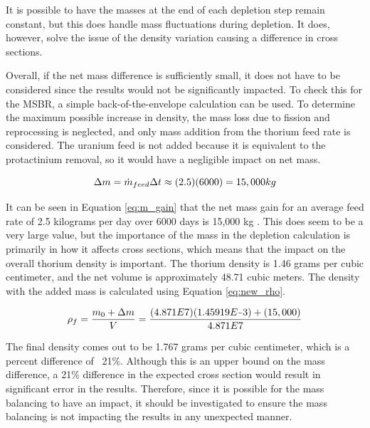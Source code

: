 It is possible to have the masses at the end of each depletion step remain constant, but this does handle mass fluctuations during depletion. It does, however, solve the issue of the density variation causing a difference in cross sections.

Overall, if the net mass difference is sufficiently small, it does not have to be considered since the results would not be significantly impacted. To check this for the MSBR, a simple back-of-the-envelope calculation can be used. To determine the maximum possible increase in density, the mass loss due to fission and reprocessing is neglected, and only mass addition from the thorium feed rate is considered. The uranium feed is not added because it is equivalent to the protactinium removal, so it would have a negligible impact on net mass. 

\begin{equation} \hfill
\Delta m = \Dot{m}_{feed} \Delta t \approx (2.5)(6000) = 15,000 kg
\hfill\label{eq:m_gain} \end{equation}

It can be seen in Equation \eqref{eq:m_gain} that the net mass gain for an average feed rate of 2.5 kilograms per day over 6000 days is 15,000 kg \cite{rykhlevskii_fuel_2020, betzler_molten_2017}. This does seem to be a very large value, but the importance of the mass in the depletion calculation is primarily in how it affects cross sections, which means that the impact on the overall thorium density is important. The thorium density is 1.46 grams per cubic centimeter, and the net volume is approximately 48.71 cubic meters. The density with the added mass is calculated using Equation \eqref{eq:new_rho}.

\begin{equation} \hfill
\rho_f = \frac{m_0 + \Delta m}{V} = \frac{(4.871E7)(1.45919E\minus3) + (15,000)}{4.871E7} 
\hfill\label{eq:new_rho} \end{equation}

The final density comes out to be 1.767 grams per cubic centimeter, which is a percent difference of ~21\%. Although this is an upper bound on the mass difference, a 21\% difference in the expected cross section would result in significant error in the results. Therefore, since it is possible for the mass balancing to have an impact, it should be investigated to ensure the mass balancing is not impacting the results in any unexpected manner.


